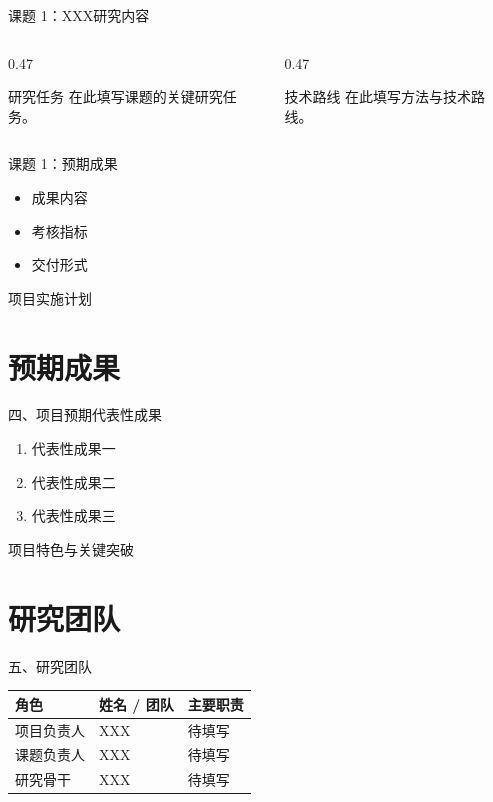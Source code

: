 \documentclass[10pt,aspectratio=169]{beamer}
\begin{document}
\begin{frame}{课题 1：XXX研究内容}
  \begin{columns}[T,onlytextwidth]
    \begin{column}{0.47\textwidth}
      \begin{block}{研究任务}
        在此填写课题的关键研究任务。
      \end{block}
    \end{column}
    \begin{column}{0.47\textwidth}
      \begin{block}{技术路线}
        在此填写方法与技术路线。
      \end{block}
    \end{column}
  \end{columns}
\end{frame}

\begin{frame}{课题 1：预期成果}
  \begin{itemize}
    \setlength{\itemsep}{0.8em}
    \item 成果内容
    \item 考核指标
    \item 交付形式
  \end{itemize}
\end{frame}

\begin{frame}{项目实施计划}
  \centering
\end{frame}

\section{预期成果}
\begin{frame}{四、项目预期代表性成果}
  \begin{enumerate}
    \setlength{\itemsep}{0.8em}
    \item 代表性成果一
    \item 代表性成果二
    \item 代表性成果三
  \end{enumerate}
\end{frame}

\begin{frame}{项目特色与关键突破}
\end{frame}

\section{研究团队}
\begin{frame}{五、研究团队}
  \renewcommand{\arraystretch}{1.7}
  \begin{tabularx}{\linewidth}{@{}llX@{}}
    \toprule
    角色 & 姓名 / 团队 & 主要职责\\
    \midrule
    项目负责人 & XXX & 待填写\\
    课题负责人 & XXX & 待填写\\
    研究骨干 & XXX & 待填写\\
    \bottomrule
  \end{tabularx}
\end{frame}
\end{document}
